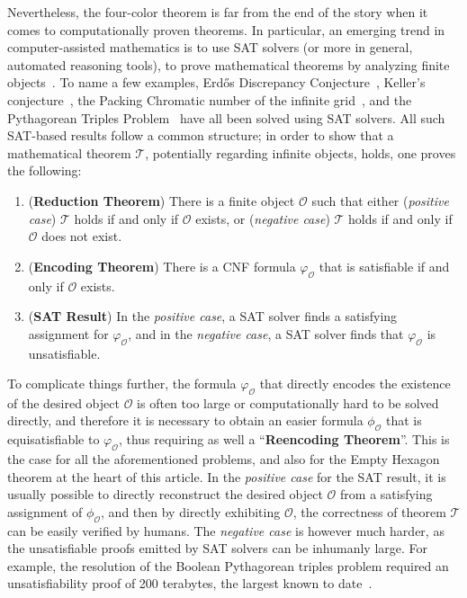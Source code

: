 Nevertheless, the four-color theorem is far from the end of the story when it comes to computationally proven theorems.
In particular, an emerging trend in computer-assisted mathematics is to use SAT solvers (or more in general, automated reasoning tools), to prove mathematical theorems by analyzing finite objects~\cite{avigad2023mathematics}. 
To name a few examples,  Erd\H{o}s Discrepancy Conjecture~\cite{konev2014sat}, Keller's conjecture~\cite{brakensiek2023resolution}, the Packing Chromatic number of the infinite grid~\cite{Subercaseaux_Heule_2023}, and the Pythagorean Triples Problem~\cite{Heule_2016} have all been solved using SAT solvers.
All such SAT-based results follow a common structure; in order to show that a mathematical theorem $\mathcal{T}$, potentially regarding infinite objects, holds, one proves the following:
\begin{enumerate}
  \item (\textbf{Reduction Theorem}) There is a finite object $\mathcal{O}$ such that either (\emph{positive case}) $\mathcal{T}$ holds if and only if $\mathcal{O}$ exists, or (\emph{negative case}) $\mathcal{T}$ holds if and only if $\mathcal{O}$ does not exist.
  \item (\textbf{Encoding Theorem}) There is a CNF formula $\varphi_{\mathcal{O}}$ that is satisfiable if and only if $\mathcal{O}$ exists.
  \item (\textbf{SAT Result}) In the \emph{positive case}, a SAT solver finds a satisfying assignment for $\varphi_{\mathcal{O}}$, and in the \emph{negative case}, a SAT solver finds that $\varphi_{\mathcal{O}}$ is unsatisfiable.
\end{enumerate}
To complicate things further, the formula $\varphi_{\mathcal{O}}$ that directly encodes the existence of the desired object $\mathcal{O}$ is often too large or computationally hard to be solved directly, and therefore it is necessary to obtain an easier formula $\phi_{\mathcal{O}}$ that is equisatisfiable to $\varphi_{\mathcal{O}}$, thus requiring as well a ``\textbf{Reencoding Theorem}''. This is the case for all the aforementioned problems, and also for the Empty Hexagon theorem at the heart of this article. 
In the \emph{positive case} for the SAT result, it is usually possible to directly reconstruct the desired object $\mathcal{O}$ from a satisfying assignment of $\phi_{\mathcal{O}}$, and then by directly exhibiting $\mathcal{O}$, the correctness of theorem $\mathcal{T}$ can be easily verified by humans. The \emph{negative case} is however much harder, as the unsatisfiable proofs emitted by SAT solvers can be inhumanly large. For example, the resolution of the Boolean Pythagorean triples problem required an unsatisfiability proof of 200 terabytes, the largest known to date~\cite{Heule_2016,lambTwohundredterabyteMathsProof2016}.
